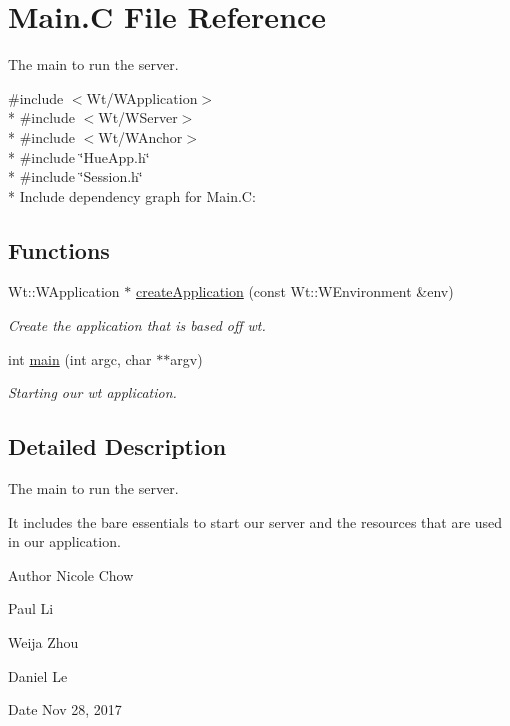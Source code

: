 \hypertarget{Main_8C}{}\section{Main.\+C File Reference}
\label{Main_8C}


The main to run the server.  


{\ttfamily \#include $<$Wt/\+W\+Application$>$}\\*
{\ttfamily \#include $<$Wt/\+W\+Server$>$}\\*
{\ttfamily \#include $<$Wt/\+W\+Anchor$>$}\\*
{\ttfamily \#include \char`\"{}Hue\+App.\+h\char`\"{}}\\*
{\ttfamily \#include \char`\"{}Session.\+h\char`\"{}}\\*
Include dependency graph for Main.\+C\+:
\subsection*{Functions}
\begin{DoxyCompactItemize}
\item 
Wt\+::\+W\+Application $\ast$ \hyperlink{Main_8C_ae1aa0ff35ce684521720eff1477893fd}{create\+Application} (const Wt\+::\+W\+Environment \&env)
\begin{DoxyCompactList}\small\item\em Create the application that is based off wt. \end{DoxyCompactList}\item 
int \hyperlink{Main_8C_a3c04138a5bfe5d72780bb7e82a18e627}{main} (int argc, char $\ast$$\ast$argv)
\begin{DoxyCompactList}\small\item\em Starting our wt application. \end{DoxyCompactList}\end{DoxyCompactItemize}


\subsection{Detailed Description}
The main to run the server. 

It includes the bare essentials to start our server and the resources that are used in our application.

\begin{DoxyAuthor}{Author}
Nicole Chow 

Paul Li 

Weija Zhou 

Daniel Le 
\end{DoxyAuthor}
\begin{DoxyDate}{Date}
Nov 28, 2017 
\end{DoxyDate}


